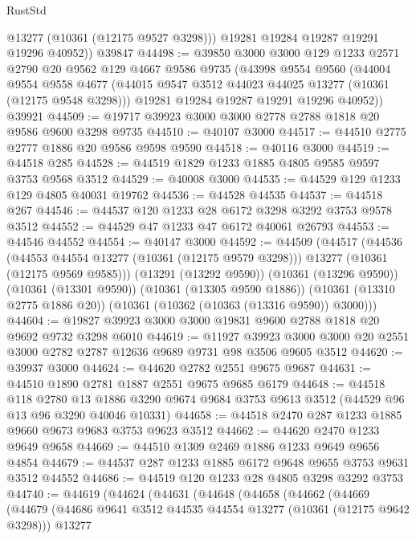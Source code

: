 \begin{lexlean}{RustStd}
\begin{coremodule}
          @13277
          (@10361 (@12175 @9527 @3298)))
        @19281
        @19284
        @19287
        @19291
        @19296
        @40952))
    @39847
@44498 := @39850
    @3000
    @3000
    @129
    @1233
    @2571
    @2790
    @20
    @9562
    @129
    @4667
    @9586
    @9735
    (@43998
      @9554
      @9560
      (@44004
        @9554
        @9558
        @4677
        (@44015 @9547 @3512 @44023 @44025 @13277 (@10361 (@12175 @9548 @3298)))
        @19281
        @19284
        @19287
        @19291
        @19296
        @40952))
    @39921
@44509 := @19717 @39923 @3000 @3000 @2778 @2788 @1818 @20 @9586 @9600 @3298 @9735
@44510 := @40107 @3000
@44517 := @44510 @2775 @2777 @1886 @20 @9586 @9598 @9590
@44518 := @40116 @3000
@44519 := @44518 @285
@44528 := @44519 @1829 @1233 @1885 @4805 @9585 @9597 @3753 @9568 @3512
@44529 := @40008 @3000
@44535 := @44529 @129 @1233 @129 @4805 @40031 @19762
@44536 := @44528 @44535
@44537 := @44518 @267
@44546 := @44537 @120 @1233 @28 @6172 @3298 @3292 @3753 @9578 @3512
@44552 := @44529 @47 @1233 @47 @6172 @40061 @26793
@44553 := @44546 @44552
@44554 := @40147 @3000
@44592 := @44509
    (@44517
      (@44536
        (@44553 @44554 @13277 (@10361 (@12175 @9579 @3298)))
        @13277
        (@10361 (@12175 @9569 @9585)))
      (@13291 (@13292 @9590))
      (@10361 (@13296 @9590))
      (@10361 (@13301 @9590))
      (@10361 (@13305 @9590 @1886))
      (@10361 (@13310 @2775 @1886 @20))
      (@10361 (@10362 (@10363 (@13316 @9590)) @3000)))
@44604 := @19827 @39923 @3000 @3000 @19831 @9600 @2788 @1818 @20 @9692 @9732 @3298 @6010
@44619 := @11927
    @39923
    @3000
    @3000
    @20
    @2551
    @3000
    @2782
    @2787
    @12636
    @9689
    @9731
    @98
    @3506
    @9605
    @3512
@44620 := @39937 @3000
@44624 := @44620 @2782 @2551 @9675 @9687
@44631 := @44510 @1890 @2781 @1887 @2551 @9675 @9685 @6179
@44648 := @44518
    @118
    @2780
    @13
    @1886
    @3290
    @9674
    @9684
    @3753
    @9613
    @3512
    (@44529 @96 @13 @96 @3290 @40046 @10331)
@44658 := @44518 @2470 @287 @1233 @1885 @9660 @9673 @9683 @3753 @9623 @3512
@44662 := @44620 @2470 @1233 @9649 @9658
@44669 := @44510 @1309 @2469 @1886 @1233 @9649 @9656 @4854
@44679 := @44537 @287 @1233 @1885 @6172 @9648 @9655 @3753 @9631 @3512 @44552
@44686 := @44519 @120 @1233 @28 @4805 @3298 @3292 @3753
@44740 := @44619
    (@44624
      (@44631
        (@44648
          (@44658
            (@44662
              (@44669
                (@44679
                  (@44686 @9641 @3512 @44535 @44554 @13277 (@10361 (@12175 @9642 @3298)))
                  @13277

\end{coremodule}
\end{lexlean}
